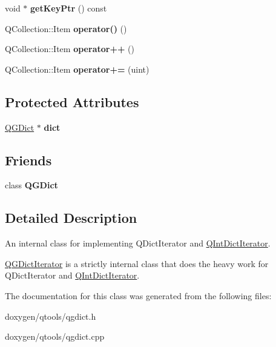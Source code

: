 \begin{DoxyCompactItemize}
void $\ast$ {\bfseries get\+Key\+Ptr} () const
\item 
\mbox{\label{class_q_g_dict_iterator_a3833bbdb7178dbfcbac95547ef4c6bcf}} 
Q\+Collection\+::\+Item {\bfseries operator()} ()
\item 
\mbox{\label{class_q_g_dict_iterator_ab4cdd2c2b2ab8714c8144a5bb54a7409}} 
Q\+Collection\+::\+Item {\bfseries operator++} ()
\item 
\mbox{\label{class_q_g_dict_iterator_a71905aff98dbecf1de97bb164d1b3203}} 
Q\+Collection\+::\+Item {\bfseries operator+=} (uint)
\end{DoxyCompactItemize}
\subsection*{Protected Attributes}
\begin{DoxyCompactItemize}
\item 
\mbox{\label{class_q_g_dict_iterator_a21c8a54a9eac2887ffa1ab1d801d544f}} 
\mbox{\hyperlink{class_q_g_dict}{Q\+G\+Dict}} $\ast$ {\bfseries dict}
\end{DoxyCompactItemize}
\subsection*{Friends}
\begin{DoxyCompactItemize}
\item 
\mbox{\label{class_q_g_dict_iterator_a97b03fadfd4d68d39a3a5e5aa0e69111}} 
class {\bfseries Q\+G\+Dict}
\end{DoxyCompactItemize}


\subsection{Detailed Description}
An internal class for implementing Q\+Dict\+Iterator and \mbox{\hyperlink{class_q_int_dict_iterator}{Q\+Int\+Dict\+Iterator}}. 

\mbox{\hyperlink{class_q_g_dict_iterator}{Q\+G\+Dict\+Iterator}} is a strictly internal class that does the heavy work for Q\+Dict\+Iterator and \mbox{\hyperlink{class_q_int_dict_iterator}{Q\+Int\+Dict\+Iterator}}. 

The documentation for this class was generated from the following files\+:\begin{DoxyCompactItemize}
\item 
doxygen/qtools/qgdict.\+h\item 
doxygen/qtools/qgdict.\+cpp\end{DoxyCompactItemize}

